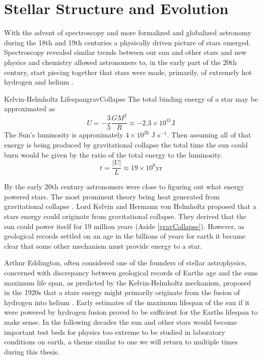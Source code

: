 \chapter{Stellar Structure and Evolution}
With the advent of spectroscopy and more formalized and globalized astronomy
during the 18th and 19th centuries a physically driven picture of stars
emerged. Spectroscopy revealed similar trends between our sun and other stars
and new physics and chemistry allowed astronomers to, in the early part of the
20th century, start piecing together that stars were made, primarily, of
extremely hot hydrogen and helium \citep{Payne1925}.

\begin{sidebar}{Kelvin-Helmholtz Lifespan}{gravCollapse}
  The total binding energy of a star may be approximated as
  \begin{equation*}
    U = -\frac{3}{5}\frac{GM^{2}}{R} \approx -2.3 \times 10^{41} \text{J}
  \end{equation*}
  The Sun's luminosity is approximately $4\times 10^{26}$ J s$^{-1}$. Then
  assuming all of that energy is being produced by gravitational collapse the
  total time the sun could burn would be given by the ratio of the total energy
  to the luminosity.
  \begin{equation*}
    t = \frac{|U|}{L} \approx 19 \times 10^{6} \text{yr}
  \end{equation*}
\end{sidebar}

By the early 20th century astronomers were close to figuring out what energy
powered stars. The most prominent theory being heat generated from
gravitational collapse \citep[which had initially been proposed as a theory of
stellar system, but not energy generation by Kant and Laplace,][]{Kalita2023}.
Lord Kelvin and Hermann von Helmholtz proposed that a stars energy could
originate from gravitational collapse. They derived that the sun could power
itself for 19 million years \citep{HUNT1900, Mestel2004} (Aside \ref{gravCollapse}). However, as
geological records settled on an age in the billions of years for earth it
became clear that some other mechanism must provide energy to a star.

Arthur Eddington, often considered one of the founders of stellar astrophysics,
concerned with discrepancy between geological records of Earths age and the
suns maximum life span, as predicted by the Kelvin-Helmholtz mechanism,
proposed in the 1920s that a stars energy might primarily originate from the
fusion of hydrogen into helium \citep{Eddington1920, Eddington1926}. Early estimates of the maximum
lifespan of the sun if it were powered by hydrogen fusion proved to be
sufficient for the Earths lifespan to make sense. In the following decades the
sun and other stars would become important test beds for physics too extreme to
be studied in laboratory conditions on earth, a theme similar to one we will
return to multiple times during this thesis.

